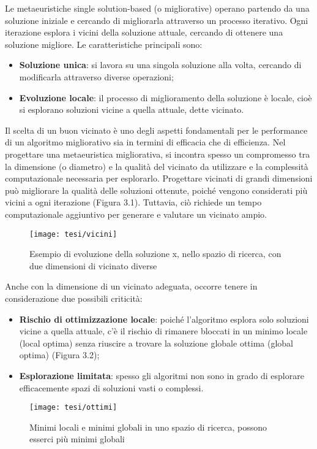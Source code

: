 Le metaeuristiche single solution-based (o migliorative) operano partendo da una soluzione iniziale e cercando di migliorarla attraverso un processo iterativo. Ogni iterazione esplora i vicini della soluzione attuale, cercando di ottenere una soluzione migliore. Le caratteristiche principali sono:
\begin{itemize}
    \item \textbf{Soluzione unica}: si lavora su una singola soluzione alla volta, cercando di modificarla attraverso diverse operazioni;
    \item \textbf{Evoluzione locale}: il processo di miglioramento della soluzione è locale, cioè si esplorano soluzioni vicine a quella attuale, dette vicinato.
\end{itemize}

Il scelta di un buon vicinato è uno degli aspetti fondamentali per le performance di un algoritmo migliorativo sia in termini di efficacia che di efficienza. Nel progettare una metaeuristica migliorativa, si incontra spesso un compromesso tra la dimensione (o diametro) e la qualità del vicinato da utilizzare e la complessità computazionale necessaria per esplorarlo. Progettare vicinati di grandi dimensioni può migliorare la qualità delle soluzioni ottenute, poiché vengono considerati più vicini a ogni iterazione (Figura 3.1). Tuttavia, ciò richiede un tempo computazionale aggiuntivo per generare e valutare un vicinato ampio.
\begin{figure}[!ht] 
    \centering 
    \texttt{[image: tesi/vicini]} 
    \caption{Esempio di evoluzione della soluzione x, nello spazio di ricerca, con due dimensioni di vicinato diverse}
\end{figure}

Anche con la dimensione di un vicinato adeguata, occorre tenere in considerazione due possibili criticità:
\begin{itemize}
    \item \textbf{Rischio di ottimizzazione locale}: poiché l'algoritmo esplora solo soluzioni vicine a quella attuale, c'è il rischio di rimanere bloccati in un minimo locale (local optima) senza riuscire a trovare la soluzione globale ottima (global optima) (Figura 3.2);
    \item \textbf{Esplorazione limitata}: spesso gli algoritmi non sono in grado di esplorare efficacemente spazi di soluzioni vasti o complessi.
\end{itemize}

\begin{figure}[!ht] 
    \centering 
    \texttt{[image: tesi/ottimi]} 
    \caption{Minimi locali e minimi globali in uno spazio di ricerca, possono esserci più minimi globali}
\end{figure}

